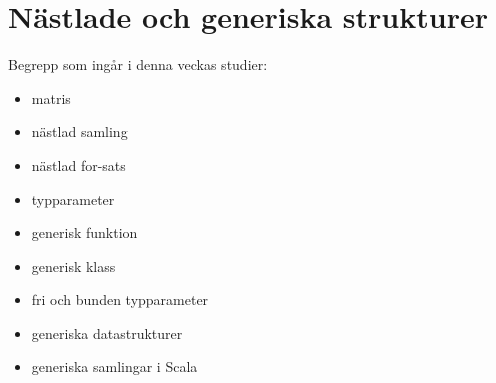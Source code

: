 \chapter{Nästlade och generiska strukturer}\label{chapter:W08}
Begrepp som ingår i denna veckas studier:
\begin{itemize}[noitemsep,label={$\square$},leftmargin=*]
\item matris
\item nästlad samling
\item nästlad for-sats
\item typparameter
\item generisk funktion
\item generisk klass
\item fri och bunden typparameter
\item generiska datastrukturer
\item generiska samlingar i Scala\end{itemize}
